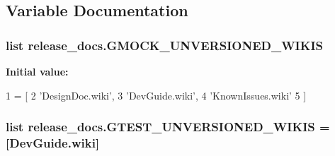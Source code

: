 \subsection{Variable Documentation}
\subsubsection[{\texorpdfstring{G\+M\+O\+C\+K\+\_\+\+U\+N\+V\+E\+R\+S\+I\+O\+N\+E\+D\+\_\+\+W\+I\+K\+IS}{GMOCK_UNVERSIONED_WIKIS}}]{\setlength{\rightskip}{0pt plus 5cm}list release\+\_\+docs.\+G\+M\+O\+C\+K\+\_\+\+U\+N\+V\+E\+R\+S\+I\+O\+N\+E\+D\+\_\+\+W\+I\+K\+IS}\hypertarget{namespacerelease__docs_a675f92ba4643a6aef7773a6178e49b29}{}\label{namespacerelease__docs_a675f92ba4643a6aef7773a6178e49b29}
{\bfseries Initial value\+:}
\begin{DoxyCode}
1 = [
2     \textcolor{stringliteral}{'DesignDoc.wiki'},
3     \textcolor{stringliteral}{'DevGuide.wiki'},
4     \textcolor{stringliteral}{'KnownIssues.wiki'}
5     ]
\end{DoxyCode}
\subsubsection[{\texorpdfstring{G\+T\+E\+S\+T\+\_\+\+U\+N\+V\+E\+R\+S\+I\+O\+N\+E\+D\+\_\+\+W\+I\+K\+IS}{GTEST_UNVERSIONED_WIKIS}}]{\setlength{\rightskip}{0pt plus 5cm}list release\+\_\+docs.\+G\+T\+E\+S\+T\+\_\+\+U\+N\+V\+E\+R\+S\+I\+O\+N\+E\+D\+\_\+\+W\+I\+K\+IS = \mbox{[}\textquotesingle{}Dev\+Guide.\+wiki\textquotesingle{}\mbox{]}}\hypertarget{namespacerelease__docs_aaeabb8c74d9db7a4b2f3c66e8f1a04ee}{}\label{namespacerelease__docs_aaeabb8c74d9db7a4b2f3c66e8f1a04ee}
